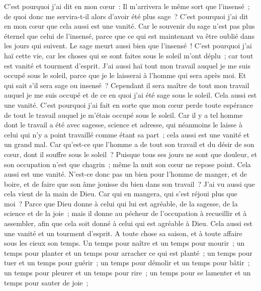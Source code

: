\begin{multicols}{2}
C'est pourquoi j'ai dit en mon cœur~: Il m'arrivera le même sort que l'insensé~; de quoi donc me servira-t-il alors d'avoir été plus sage~? C'est pourquoi j'ai dit en mon cœur que cela aussi est une vanité.
Car le souvenir du sage n'est pas plus éternel que celui de l'insensé, parce que ce qui est maintenant va être oublié dans les jours qui suivent. Le sage meurt aussi bien que l'insensé~!
C'est pourquoi j'ai haï cette vie, car les choses qui se sont faites sous le soleil m'ont déplu~; car tout est vanité et tourment d'esprit.
J'ai aussi haï tout mon travail auquel je me suis occupé sous le soleil, parce que je le laisserai à l'homme qui sera après moi.
Et qui sait s'il sera sage ou insensé~? Cependant il sera maître de tout mon travail auquel je me suis occupé et de ce en quoi j'ai été sage sous le soleil. Cela aussi est une vanité.
C'est pourquoi j'ai fait en sorte que mon cœur perde toute espérance de tout le travail auquel je m'étais occupé sous le soleil.
Car il y a tel homme dont le travail a été avec sagesse, science et adresse, qui néanmoins le laisse à celui qui n'y a point travaillé comme étant sa part~; cela aussi est une vanité et un grand mal.
Car qu'est-ce que l'homme a de tout son travail et du désir de son cœur, dont il souffre sous le soleil~?
Puisque tous ses jours ne sont que douleur, et son occupation n'est que chagrin~; même la nuit son cœur ne repose point. Cela aussi est une vanité.
N'est-ce donc pas un bien pour l'homme de manger, et de boire, et de faire que son âme jouisse du bien dans son travail~? J'ai vu aussi que cela vient de la main de Dieu.
Car qui en mangera, qui s'est réjoui plus que moi~?
Parce que Dieu donne à celui qui lui est agréable, de la sagesse, de la science et de la joie~; mais il donne au pécheur de l'occupation à recueillir et à assembler, afin que cela soit donné à celui qui est agréable à Dieu. Cela aussi est une vanité et un tourment d'esprit.
\VerseOne{}A toute chose sa saison, et à toute affaire sous les cieux son temps.
Un temps pour naître et un temps pour mourir~; un temps pour planter et un temps pour arracher ce qui est planté~;
un temps pour tuer et un temps pour guérir~; un temps pour démolir et un temps pour bâtir~;
un temps pour pleurer et un temps pour rire~; un temps pour se lamenter et un temps pour sauter de joie~;

\end{multicols}
